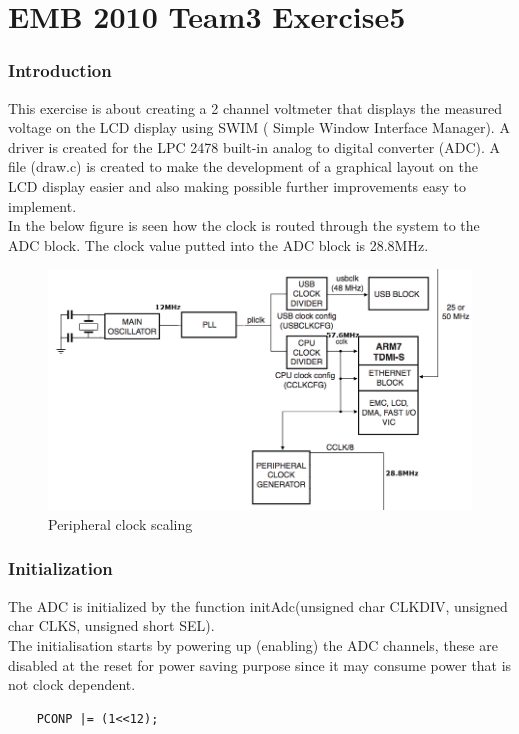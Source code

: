 

\part*{EMB 2010 Team3 Exercise5}
\section{Introduction}
This exercise is about creating a 2 channel voltmeter that displays the measured voltage on the LCD display using SWIM ( Simple Window Interface Manager).
A driver is created for the LPC 2478 built-in analog to digital converter (ADC).
A file (draw.c) is created to make the development of a graphical layout on the LCD display easier and also making possible further improvements easy to implement. 
\\ \newline
In the below figure is seen how the clock is routed through the system to the ADC block. The clock value putted into the ADC block is 28.8MHz.
\\ \newline
\begin{figure}[h!]
   \centering
   \includegraphics[width=1\textwidth]{peripheral_clock_gen.png}
   \caption{Peripheral clock scaling}
   \label{fig:example}
\end{figure}

\newpage
\section{Initialization}

The ADC is initialized by the function initAdc(unsigned char CLKDIV, unsigned char CLKS, unsigned short SEL).
\\ \newline
The initialisation starts by powering up (enabling) the ADC channels, these are disabled at the reset for power saving purpose since it may consume power that is not clock dependent.
\begin{lstlisting} 
	PCONP |= (1<<12);
 \end{lstlisting}

